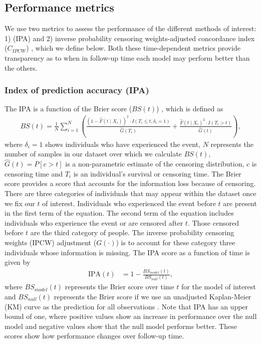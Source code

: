 \documentclass[AMA,STIX1COL,]{WileyNJD-v2}
\begin{document}
\hypertarget{performance-metrics}{%
\subsection{Performance metrics}\label{performance-metrics}}

We use two metrics to assess the performance of the different methods of
interest: 1) (IPA) \citep{kattan2018index} and 2) inverse probability
censoring weights-adjusted concordance index (\(C_{IPCW}\))
\citep{uno2011}, which we define below. Both these time-dependent
metrics provide transparency as to when in follow-up time each model may
perform better than the others.

\hypertarget{index-of-prediction-accuracy-ipa}{%
\subsubsection{Index of prediction accuracy
(IPA)}\label{index-of-prediction-accuracy-ipa}}

The IPA is a function of the Brier score (\(BS(t)\)) \citep{graf1999},
which is defined as \begin{align}
BS(t)=\frac{1}{N}\sum^{N}_{i=1}\left(\frac{\left(1 - \widehat{F}(t \mid X_{i})\right)^{2}\cdot I(T_{i}\leq t,\delta_{i}=1)}{\widehat{G}(T_{i})} + \frac{\widehat{F}(t\mid X_{i})^{2}\cdot I(T_{i}>t)}{\widehat{G}(t)}\right),
\end{align} where \(\delta_{i}=1\) shows individuals who have
experienced the event, \(N\) represents the number of samples in our
dataset over which we calculate \(BS(t)\), \(\widehat{G}(t)=P[c>t]\) is
a non-parametric estimate of the censoring distribution, \(c\) is
censoring time and \(T_{i}\) is an individual's survival or censoring
time. The Brier score provides a score that accounts for the information
loss because of censoring. There are three categories of individuals
that may appear within the dataset once we fix our \(t\) of interest.
Individuals who experienced the event before \(t\) are present in the
first term of the equation. The second term of the equation includes
individuals who experience the event or are censored after \(t\). Those
censored before \(t\) are the third category of people. The inverse
probability censoring weights (IPCW) adjustment (\(G(\cdot)\)) is to
account for these category three individuals whose information is
missing. The IPA score as a function of time is given by \begin{align}
\textrm{IPA}(t) &= 1-\frac{BS_{model}(t)}{BS_{null}(t)}, \nonumber
\end{align} where \(BS_{model}(t)\) represents the Brier score over time
\(t\) for the model of interest and \(BS_{null}(t)\) represents the
Brier score if we use an unadjusted Kaplan-Meier (KM) curve as the
prediction for all observations \citep{kattan2018index}. Note that IPA
has an upper bound of one, where positive values show an increase in
performance over the null model and negative values show that the null
model performs better. These scores show how performance changes over
follow-up time.
\end{document}
